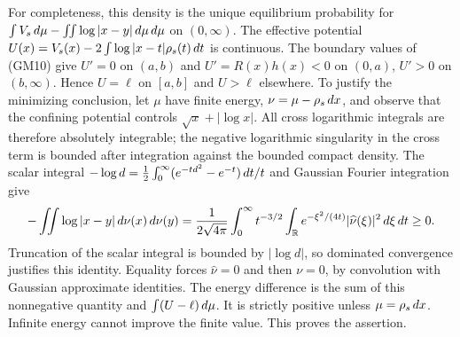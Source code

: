 \documentclass[11pt]{article}
\begin{document}
For completeness, this density is the unique equilibrium probability
for $\int V_s\,d\mu-\iint\log|x-y|\,d\mu\,d\mu$ on $(0,\infty)$.
The effective potential
$U(x)=V_s(x)-2\int\log|x-t|\rho_s(t)\,d t$ is continuous.
The boundary values of (GM10) give $U'=0$ on $(a,b)$ and
$U'=R(x)h(x)<0$ on $(0,a)$, $U'>0$ on $(b,\infty)$.
Hence $U=\ell$ on $[a,b]$ and $U>\ell$ elsewhere.
To justify the minimizing conclusion, let $\mu$ have finite energy,
$\nu=\mu-\rho_s\,d x$, and observe that the confining potential
controls $\sqrt x+|\log x|$. All cross logarithmic integrals are therefore
absolutely integrable; the negative logarithmic singularity in the cross
term is bounded after integration against the bounded compact density.
The scalar integral
$-\log d=\tfrac12\int_0^\infty(e^{-td^2}-e^{-t})\,d t/t$
and Gaussian Fourier integration give
\[
 -\iint\log|x-y|\,d\nu(x)\,d\nu(y)
 =\frac1{2\sqrt{4\pi}}\int_0^\infty t^{-3/2}
       \int_\mathbb R e^{-\xi^2/(4t)}|\widehat\nu(\xi)|^2\,d\xi\,d t\ge0.
\]
Truncation of the scalar integral is bounded by $|\log d|$, so dominated
convergence justifies this identity. Equality forces $\widehat\nu=0$ and
then $\nu=0$, by convolution with Gaussian approximate identities.
The energy difference is the sum of this nonnegative quantity and
$\int(U-\ell)\,d\mu$. It is strictly positive unless $\mu=\rho_s\,d x$.
Infinite energy cannot improve the finite value. This proves the assertion.
\end{document}
